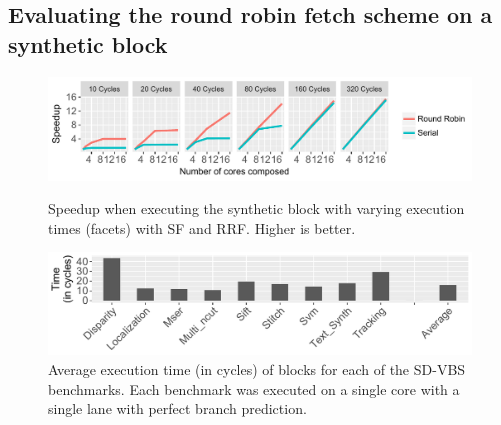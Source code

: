
\subsection{Evaluating the round robin fetch scheme on a synthetic block}

\begin{figure}[t]
    \centering
    \includegraphics[width=1\textwidth]{chapter3/graphics/motivation_fetch2.pdf}
   	\vspace{-2em}
 \caption{Speedup when executing the synthetic block with varying execution times (facets) with SF and RRF. Higher is better.}
    \label{fig:motiv_res}
    \centering
    \includegraphics[width=1\textwidth]{chapter3/graphics/sdvbsav.pdf}
    
	\vspace{-0.5em}
	\caption{Average execution time (in cycles) of blocks for each of the SD-VBS benchmarks. Each benchmark was executed on a single core with a single lane with perfect branch prediction.}
	
    \label{fig:svdbs_av}
\vspace{1em}
\end{figure}

